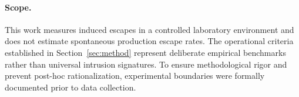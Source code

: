 \paragraph{Scope.}
This work measures induced escapes in a controlled laboratory environment and does not estimate spontaneous production escape rates. 
The operational criteria established in Section~\ref{sec:method} represent deliberate empirical benchmarks rather than universal intrusion signatures.
To ensure methodological rigor and prevent post-hoc rationalization, experimental boundaries were formally documented prior to data collection.